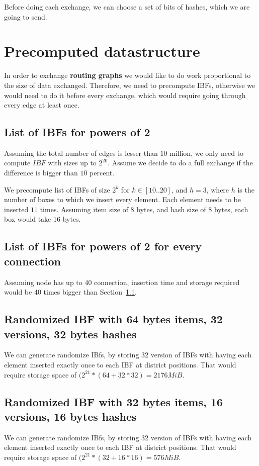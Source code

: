 \documentclass[11pt]{article}
\begin{document}
Before doing each exchange, we can choose a set of bits of hashes, which we are going to send.

\section{Precomputed datastructure}
In order to exchange \textbf{routing graphs} we would like to do work proportional to the size of data exchanged.
Therefore, we need to precompute IBFs, otherwise we would need to do it before every exchange, which would require going through every edge at least once.
\subsection{List of IBFs for powers of 2}  \label{first_precomputed}
Assuming the total number of edges is lesser than $10$ million, we only need to compute $IBF$ with sizes up to $2^{20}$.
Assume we decide to do a full exchange if the difference is bigger than $10$ percent.

We precompute list of IBFs of size $2^k$ for $k \in [10..20]$, and $h = 3$, where $h$ is the number of boxes to which we insert every element.
Each element needs to be inserted $11$ times. Assuming item size of $8$ bytes, and hash size of $8$ bytes, each box would take 16 bytes.

\subsection{List of IBFs for powers of 2 for every connection}
Assuming node has up to 40 connection, insertion time and storage required would be 40 times bigger than Section~\ref{first_precomputed}.

\subsection{Randomized IBF with 64 bytes items, 32 versions, 32 bytes hashes}
We can generate randomize IBfs, by storing 32 version of IBFs with having each element inserted exactly once to each IBF at district positions.
That would require storage space of $(2^{21} * (64 + 32 * 32) = 2176 MiB$.

\subsection{Randomized IBF with 32 bytes items, 16 versions, 16 bytes hashes}
We can generate randomize IBfs, by storing 32 version of IBFs with having each element inserted exactly once to each IBF at district positions.
That would require storage space of $(2^{21} * (32 +16 * 16) = 576 MiB$.
\end{document}
